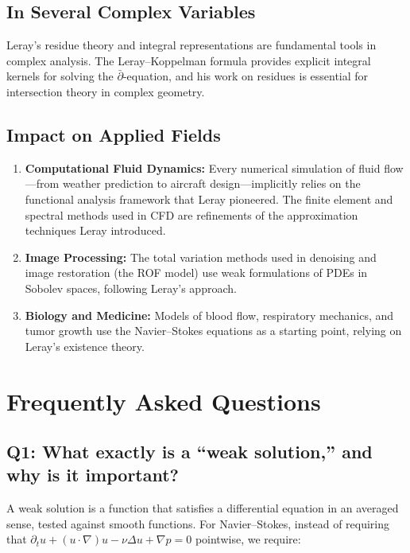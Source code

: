 \subsection{In Several Complex Variables}

Leray's residue theory and integral representations are fundamental tools in complex analysis. The Leray--Koppelman formula provides explicit integral kernels for solving the $\bar\partial$-equation, and his work on residues is essential for intersection theory in complex geometry.

\subsection{Impact on Applied Fields}

\begin{enumerate}
\item \textbf{Computational Fluid Dynamics:} Every numerical simulation of fluid flow---from weather prediction to aircraft design---implicitly relies on the functional analysis framework that Leray pioneered. The finite element and spectral methods used in CFD are refinements of the approximation techniques Leray introduced.
\item \textbf{Image Processing:} The total variation methods used in denoising and image restoration (the ROF model) use weak formulations of PDEs in Sobolev spaces, following Leray's approach.
\item \textbf{Biology and Medicine:} Models of blood flow, respiratory mechanics, and tumor growth use the Navier--Stokes equations as a starting point, relying on Leray's existence theory.
\end{enumerate}

\section{Frequently Asked Questions}

\subsection*{Q1: What exactly is a ``weak solution,'' and why is it important?}

A weak solution is a function that satisfies a differential equation in an averaged sense, tested against smooth functions. For Navier--Stokes, instead of requiring that $\partial_t u + (u \cdot \nabla)u - \nu\Delta u + \nabla p = 0$ pointwise, we require:

